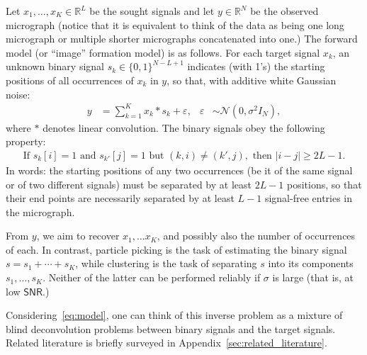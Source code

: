 \documentclass[english,11pt]{article}
\newcommand{\1}{\mathbf{1}}
\numberwithin{equation}{section}
\theoremstyle{plain}
\theoremstyle{definition}
\theoremstyle{remark}
\theoremstyle{plain}
\theoremstyle{remark}
\theoremstyle{plain}
\theoremstyle{plain}
\newcommand{\RL}{\mathbb{R}^L}
\newcommand{\RN}{\mathbb{R}^N}
\newcommand{\SNR}{\ensuremath{\textsf{SNR}}}
\begin{document}
Let $x_1,\ldots,x_K\in\RL$ be the sought signals and let $y\in\RN$ be the observed micrograph (notice that it is equivalent to think of the data as being one long micrograph or multiple shorter micrographs concatenated into one.)
The forward model (or ``image'' formation model) is as follows. For each target signal $x_k$, an unknown binary signal $s_k \in \{0, 1\}^{N-L+1}$ indicates (with 1's) the starting positions of all occurrences of $x_k$ in $y$, so that, with additive white Gaussian noise:
\begin{align}
y & = \sum_{k=1}^K x_k \ast s_k + \varepsilon, & \varepsilon & \sim \mathcal{N}(0,\sigma^2 I_N),
\label{eq:model}
\end{align}
where $\ast$ denotes linear convolution. The binary signals obey the following property:
\begin{align}
\textrm{If } s_k[i] = 1 \textrm{ and } s_{k'}[j] = 1 \textrm{ but } (k, i) \neq (k', j), \textrm{ then } |i - j| \geq 2L-1.
\label{eq:spacing}
\end{align}
In words: the starting positions of any two occurrences (be it of the same signal or of two different signals) must be separated by at least $2L-1$ positions, so that their end points are necessarily separated by at least $L-1$ signal-free entries in the micrograph.

From $y$, we aim to recover $x_1, \ldots x_K$, and possibly also the number of occurrences of each. In contrast, particle picking is the task of estimating the binary signal $s = s_1 + \cdots + s_K$, while clustering is the task of separating $s$ into its components $s_1, \ldots, s_K$. Neither of the latter can be performed reliably if $\sigma$ is large (that is, at low $\SNR$.)



Considering~\eqref{eq:model}, one can think of this inverse problem as a mixture of blind deconvolution problems between binary signals and the target signals. Related literature is briefly surveyed in Appendix~\ref{sec:related_literature}.

\end{document}
